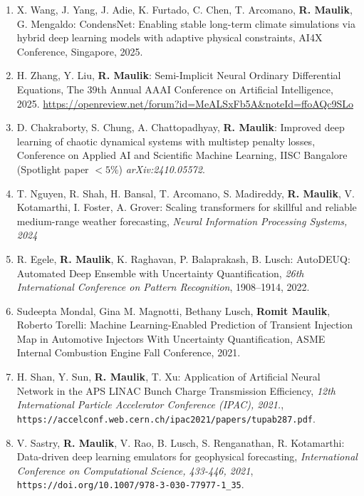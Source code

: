 \documentclass[letterpaper]{article}
\begin{document}
\begin{enumerate}

\item X. Wang, J. Yang, J. Adie, K. Furtado, C. Chen, T. Arcomano, \textbf{R. Maulik}, G. Mengaldo: CondensNet: Enabling stable long-term climate simulations via hybrid deep learning models with adaptive physical constraints, AI4X Conference, Singapore, 2025.

\item H. Zhang, Y. Liu, \textbf{R. Maulik}: Semi-Implicit Neural Ordinary Differential Equations, The 39th Annual AAAI Conference on Artificial Intelligence, 2025. \url{https://openreview.net/forum?id=MeALSxFb5A&noteId=ffoAQc9SLo}

\item D. Chakraborty, S. Chung, A. Chattopadhyay, \textbf{R. Maulik}: Improved deep learning of chaotic dynamical systems with multistep penalty losses, Conference on Applied AI and Scientific Machine Learning, IISC Bangalore (Spotlight paper $<5\%$) {\it arXiv:2410.05572}.

\item T. Nguyen, R. Shah, H. Bansal, T. Arcomano, S. Madireddy, \textbf{R. Maulik}, V. Kotamarthi, I. Foster, A. Grover: Scaling transformers for skillful and reliable medium-range weather forecasting, {\it Neural Information Processing Systems, 2024}

\item R. Egele, \textbf{R. Maulik}, K. Raghavan, P. Balaprakash, B. Lusch: AutoDEUQ: Automated Deep Ensemble with Uncertainty Quantification, {\it 26th International Conference on Pattern Recognition}, 1908--1914, 2022.

\item Sudeepta Mondal, Gina M. Magnotti, Bethany Lusch, \textbf{Romit Maulik}, Roberto Torelli: Machine Learning-Enabled Prediction of Transient Injection Map in Automotive Injectors With Uncertainty Quantification, ASME Internal Combustion Engine Fall Conference, 2021. 

\item H. Shan, Y. Sun, \textbf{R. Maulik}, T. Xu: Application of Artificial Neural Network in the APS LINAC Bunch Charge Transmission Efficiency, {\it 12th International Particle Accelerator Conference (IPAC), 2021.}, \\ \texttt{https://accelconf.web.cern.ch/ipac2021/papers/tupab287.pdf}.

\item V. Sastry, \textbf{R. Maulik}, V. Rao, B. Lusch, S. Renganathan, R. Kotamarthi: Data-driven deep learning emulators for geophysical forecasting, {\it International Conference on Computational Science, 433-446, 2021}, \\ \texttt{https://doi.org/10.1007/978-3-030-77977-1\_35}. 


\end{enumerate}
\end{document}
